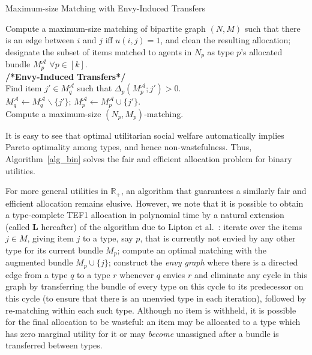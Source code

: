\documentclass[11pt,dvipdfmx]{article}
\newcommand{\R}{\mathbb{R}}
\begin{document}
\begin{algorithm}
	\DontPrintSemicolon
	\caption{Maximum-size Matching with Envy-Induced Transfers}\label{alg_bin}
	
	Compute a maximum-size matching of bipartite graph $(N,M)$ such that there is an edge between $i$ and $j$ iff $u(i,j)=1$, and clean the resulting allocation; designate the subset of items matched to agents in $N_p$ as type $p$'s allocated bundle $M^\mathcal{A}_p$ $\forall p \in [k]$. \label{MM}\\						
	\textbf{/*Envy-Induced Transfers*/}\\
	{
		Find item $j' \in M^\mathcal{A}_q$ such that $\Delta_p(M^\mathcal{A}_p;j')>0$.\\
		$M^\mathcal{A}_q \leftarrow M^\mathcal{A}_q \backslash \{j'\}$; $M^\mathcal{A}_p \leftarrow M^\mathcal{A}_p \cup \{j'\}$.\\
		Compute a maximum-size $(N_p,M_p)$-matching.
	}			
\end{algorithm}
It is easy to see that optimal utilitarian social welfare automatically implies Pareto optimality among types, and hence non-wastefulness. Thus, Algorithm~\ref{alg_bin} solves the fair and efficient allocation problem for binary utilities.

For more general utilities in $\R_+$, an algorithm that guarantees a similarly fair and efficient allocation remains elusive. 
However, we note that it is possible to obtain a type-complete TEF1 allocation in polynomial time by a natural extension (called {\bf L} hereafter) of the algorithm due to Lipton et al.~\cite{lipton2004approximately}: iterate over the items $j \in M$, giving item $j$ to a type, say $p$, that is currently not envied by any other type for its current bundle $M_p$; compute an optimal matching with the augmented bundle $M_p \cup \{j\}$; construct the \emph{envy graph} where there is a directed edge from a type $q$ to a type $r$ whenever $q$ envies $r$ and eliminate any cycle in this graph by transferring  the bundle of every type on this cycle to its predecessor on this cycle (to ensure that there is an unenvied type in each iteration), followed by re-matching within each such type. 
Although no item is withheld, it is possible for the final allocation to be wasteful: an item may be allocated to a type which has zero marginal utility for it or may \emph{become} unassigned after a bundle is transferred between types. 
\end{document}
